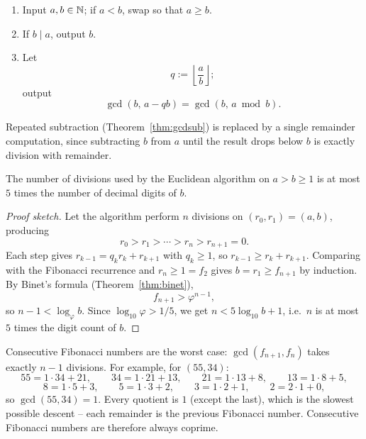 \documentclass[11pt]{article}
\begin{document}
\begin{definition}
\begin{enumerate}
\item Input $a,b\in\mathbb{N}$; if $a<b$, swap so that $a\ge b$.
\item If $b\mid a$, output $b$.
\item Let
\[
q:=\left\lfloor\frac ab\right\rfloor;
\]
output
\[
\gcd(b,\,a-qb)=\gcd(b,\,a\bmod b).
\]
\end{enumerate}
\end{definition}

\begin{note}
Repeated subtraction (Theorem~\ref{thm:gcdsub}) is replaced by a single remainder computation, since subtracting $b$ from $a$ until the result drops below $b$ is exactly division with remainder.
\end{note}

\begin{theorem}
\label{thm:lame}
The number of divisions used by the Euclidean algorithm on $a>b\ge1$ is at most $5$ times the number of decimal digits of $b$.
\end{theorem}

\begin{proof}[Proof sketch]
Let the algorithm perform $n$ divisions on $(r_0,r_1)=(a,b)$, producing
\[
r_0>r_1>\cdots>r_n>r_{n+1}=0.
\]
Each step gives $r_{k-1}=q_kr_k+r_{k+1}$ with $q_k\ge1$, so $r_{k-1}\ge r_k+r_{k+1}$. Comparing with the Fibonacci recurrence and $r_n\ge1=f_2$ gives $b=r_1\ge f_{n+1}$ by induction. By Binet's formula (Theorem~\ref{thm:binet}),
\[
f_{n+1}>\varphi^{n-1},
\]
so $n-1<\log_\varphi b$. Since $\log_{10}\varphi>1/5$, we get $n<5\log_{10}b+1$, i.e.\ $n$ is at most $5$ times the digit count of $b$.
\end{proof}

\begin{example}
Consecutive Fibonacci numbers are the worst case: $\gcd(f_{n+1},f_n)$ takes exactly $n-1$ divisions. For example, for $(55,34)$:
\[
55=1\cdot34+21, \qquad 34=1\cdot21+13, \qquad 21=1\cdot13+8, \qquad 13=1\cdot8+5,
\]
\[
8=1\cdot5+3, \qquad 5=1\cdot3+2, \qquad 3=1\cdot2+1, \qquad 2=2\cdot1+0,
\]
so $\gcd(55,34)=1$. Every quotient is $1$ (except the last), which is the slowest possible descent -- each remainder is the previous Fibonacci number. Consecutive Fibonacci numbers are therefore always coprime.
\end{example}
\end{document}
